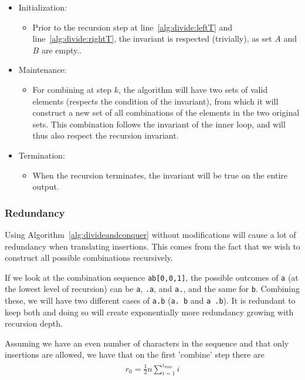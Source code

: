 \documentclass[12pt]{article}
\theoremstyle{definition}
\begin{document}
\begin{itemize}
\item Initialization:
\begin{itemize}
	\item[] Prior to the recursion step at line~\ref{alg:divide:leftT} and line~\ref{alg:divide:rightT}, the invariant is respected (trivially), as set $A$ and $B$ are empty..
\end{itemize}

\item Maintenance:
\begin{itemize}
	\item[] For combining at step $k$, the algorithm will have two sets of valid elements (respects the condition of the invariant), from which it will construct a new set of all combinations of the elements in the two original sets. This combination follows the invariant of the inner loop, and will thus also respect the recursion invariant.
\end{itemize}

\item Termination:
\begin{itemize}
	\item[] When the recursion terminates, the invariant will be true on the entire output.
\end{itemize}
\end{itemize}


\subsubsection{Redundancy}

Using Algorithm~\ref{alg:divideandconquer} without modifications will cause a lot of redundancy when translating insertions. This comes from the fact that we wish to construct all possible combinations recursively.

If we look at the combination sequence \texttt{ab[0,0,1]}, the possible outcomes of \texttt{a} (at the lowest level of recursion) can be \texttt{a}, \texttt{.a}, and \texttt{a.}, and the same for \texttt{b}. Combining these, we will have two different cases of \texttt{a.b} (\texttt{a. b} and \texttt{a .b}). It is redundant to keep both and doing so will create exponentially more redundancy growing with recursion depth.

Assuming we have an even number of characters in the sequence and that only insertions are allowed, we have that on the first 'combine' step there are
\begin{eqnarray}
	\label{r_0}
	r_0 = \frac{1}{2}n\sum^{i_{max}}_{i=1} i
\end{eqnarray}
\end{document}
